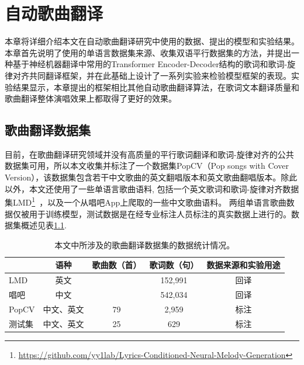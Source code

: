 \newcommand{\modelname}{LTAG}
\chapter{自动歌曲翻译}
本章将详细介绍本文在自动歌曲翻译研究中使用的数据、提出的模型和实验结果。本章首先说明了使用的单语言数据集来源、收集双语平行数据集的方法，并提出一种基于神经机器翻译中常用的Transformer Encoder-Decoder结构的歌词和歌词-旋律对齐共同翻译框架，并在此基础上设计了一系列实验来检验模型框架的表现。实验结果显示，本章提出的框架相比其他自动歌曲翻译算法，在歌词文本翻译质量和歌曲翻译整体演唱效果上都取得了更好的效果。
\section{歌曲翻译数据集}
目前，在歌曲翻译研究领域并没有高质量的平行歌词翻译和歌词-旋律对齐的公共数据集可用，所以本文收集并标注了一个数据集PopCV（Pop songs with Cover Version），该数据集包含若干中文歌曲的英文翻唱版本和英文歌曲翻唱版本。除此以外，本文还使用了一些单语言歌曲语料, 包括一个英文歌词和歌词-旋律对齐数据集LMD\footnote{\url{https://github.com/yy1lab/Lyrics-Conditioned-Neural-Melody-Generation}}~\citep{LMD}，以及一个从唱吧App上爬取的一些中文歌曲语料。
两组单语言歌曲数据仅被用于训练模型，测试数据是在经专业标注人员标注的真实数据上进行的。数据集概述见表\ref{tab:dataset_stat}.
\begin{table}[htbp]
    \centering
    \begin{tabular}{|l|c|c|c|c|}
    \hline
         & 语种 & 歌曲数（首） & 歌词数（句） & 数据来源和实验用途\\
    \hline
     LMD & 英文 & \diagbox[]{}{} & 152,991 & 回译\\
    \hline
     唱吧 & 中文 & \diagbox[]{}{} & 542,034 & 回译\\
    \hline
     PopCV & 中文、英文 & 79 & 2,959 & 标注\\
    \hline
     测试集 & 中文、英文 & 25 & 629 & 标注\\
    \hline
    \end{tabular}
    \caption{本文中所涉及的歌曲翻译数据集的数据统计情况。}
    \label{tab:dataset_stat}
\end{table}

